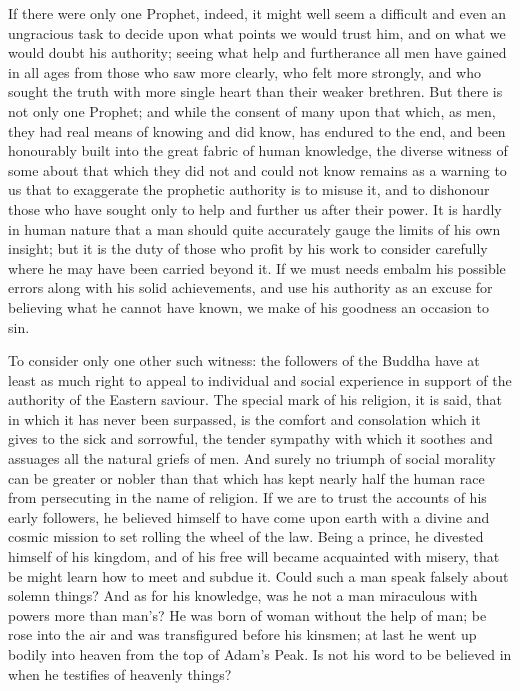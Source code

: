 \documentclass[12pt]{article}
\begin{document}
If there were only one Prophet, indeed, it might well seem a difficult and even an ungracious task to decide upon what points we would trust him, and on what we would doubt his authority; seeing what help and furtherance all men have gained in all ages from those who saw more clearly, who felt more strongly, and who sought the truth with more single heart than their weaker brethren. But there is not only one Prophet; and while the consent of many upon that which, as men, they had real means of knowing and did know, has endured to the end, and been honourably built into the great fabric of human knowledge, the diverse witness of some about that which they did not and could not know remains as a warning to us that to exaggerate the prophetic authority is to misuse it, and to dishonour those who have sought only to help and further us after their power. It is hardly in human nature that a man should quite accurately gauge the limits of his own insight; but it is the duty of those who profit by his work to consider carefully where he may have been carried beyond it. If we must needs embalm his possible errors along with his solid achievements, and use his authority as an excuse for believing what he cannot have known, we make of his goodness an occasion to sin.

To consider only one other such witness: the followers of the Buddha have at least as much right to appeal to individual and social experience in support of the authority of the Eastern saviour. The special mark of his religion, it is said, that in which it has never been surpassed, is the comfort and consolation which it gives to the sick and sorrowful, the tender sympathy with which it soothes and assuages all the natural griefs of men. And surely no triumph of social morality can be greater or nobler than that which has kept nearly half the human race from persecuting in the name of religion. If we are to trust the accounts of his early followers, he believed himself to have come upon earth with a divine and cosmic mission to set rolling the wheel of the law. Being a prince, he divested himself of his kingdom, and of his free will became acquainted with misery, that be might learn how to meet and subdue it. Could such a man speak falsely about solemn things? And as for his knowledge, was he not a man miraculous with powers more than man's? He was born of woman without the help of man; be rose into the air and was transfigured before his kinsmen; at last he went up bodily into heaven from the top of Adam's Peak. Is not his word to be believed in when he testifies of heavenly things?
\end{document}
